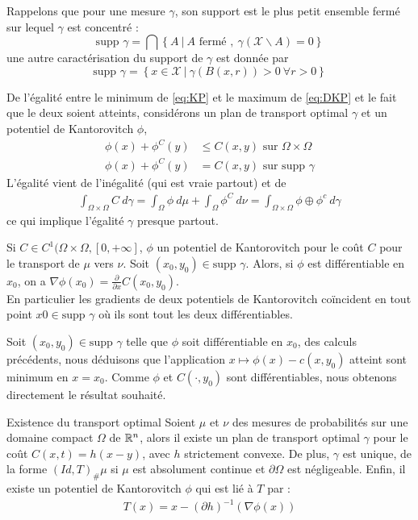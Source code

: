 \documentclass[a4paper,12pt]{article}
\newcommand{\supp}{\text{supp }}
\begin{document}
Rappelons que pour une mesure $\gamma$, son support est le plus petit ensemble fermé sur lequel $\gamma$ est concentré : 
$$
\supp \gamma = \bigcap \left\{A\ |\ A \text{ fermé },\ \gamma(\mathcal{X}\backslash A) = 0 \right\}
$$
une autre caractérisation du support de $\gamma$ est donnée par 
$$
\supp\gamma = \left\{x\in\mathcal{X}\ |\ \gamma(B(x,r)) >0\ \forall r>0\right\}
$$

De l'égalité entre le minimum de \eqref{eq:KP} et le maximum de \eqref{eq:DKP} et le fait que le deux soient atteints, considérons un plan de transport optimal $\gamma$ et un potentiel de Kantorovitch $\phi$, 
\begin{align}
\phi(x)+\phi^C(y) &\leq C(x,y) \text{ sur } \Omega\times\Omega \\
\phi(x)+\phi^C(y) &= C(x,y) \text{ sur }\supp\gamma
\end{align}
L'égalité vient de l'inégalité (qui est vraie partout) et de 
\begin{align}
\int_{\Omega\times\Omega} C\ d\gamma = \int_{\Omega}\phi\ d\mu +  \int_{\Omega} \phi^C\ d\nu = \int_{\Omega\times\Omega} \phi\oplus\phi^c\ d\gamma
\end{align}
ce qui implique l'égalité $\gamma$ presque partout. 

\begin{proposition}
Si $C\in C^1(\Omega\times\Omega,[0,+\infty]$, $\phi$ un potentiel de Kantorovitch pour le coût $C$ pour le transport de $\mu$ vers $\nu$. Soit $(x_0,y_0)\in\supp\gamma$. Alors, si $\phi$ est différentiable en $x_0$, on a $\nabla\phi(x_0)= \frac{\partial}{\partial x}C(x_0,y_0)$.\\
En particulier les gradients de deux potentiels de Kantorovitch coïncident en tout point $x0\in\supp\gamma$ où ils sont tout les deux différentiables.
\end{proposition}
\begin{preuve}
Soit $(x_0,y_0)\in\supp\gamma$ telle que $\phi$ soit différentiable en $x_0$, des calculs précédents, nous déduisons que l'application $x\mapsto\phi(x)-c(x,y_0)$ atteint sont minimum en $x=x_0$. 
Comme $\phi$ et $C(\cdot,y_0)$ sont différentiables, nous obtenons directement le résultat souhaité. 
\end{preuve}


\begin{theoreme}{Existence du transport optimal}
Soient $\mu$ et $\nu$ des mesures de probabilités sur une domaine compact $\Omega$ de $\mathbb{R}^n$, alors il existe un plan de transport optimal $\gamma$ pour le coût $C(x,t) = h(x-y)$, avec $h$ strictement convexe. 
De plus, $\gamma$ est unique, de la forme $(Id,T)_{\#}\mu$ si $\mu$ est absolument continue et $\partial\Omega$ est négligeable. Enfin, il existe un potentiel de Kantorovitch $\phi$ qui est lié à $T$ par :
\begin{align}
T(x) = x- (\partial h)^{-1}(\nabla\phi(x))
\end{align}
\end{theoreme}
\end{document}
